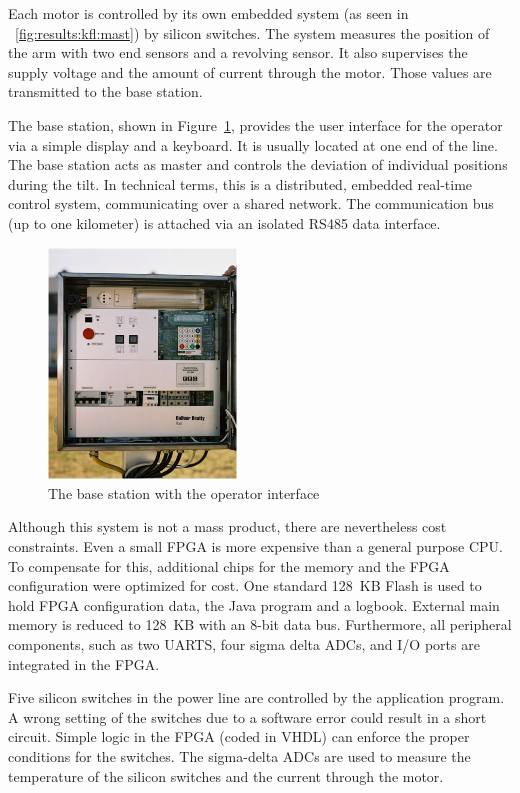 Each motor is controlled by its own embedded system (as seen in
\figurename~\ref{fig:results:kfl:mast}) by silicon switches. The
system measures the position of the arm with two end sensors and a
revolving sensor. It also supervises the supply voltage and the
amount of current through the motor. Those values are transmitted to
the base station.

The base station, shown in Figure~\ref{fig:results:base}, provides
the user interface for the operator via a simple display and a
keyboard. It is usually located at one end of the line. The base
station acts as master and controls the deviation of individual
positions during the tilt. In technical terms, this is a distributed,
embedded real-time control system, communicating over a shared
network. The communication bus (up to one kilometer) is attached via
an isolated RS485 data interface.

\begin{figure}
    \centering
    \includegraphics[width=5cm]{results/base}
    \caption{The base station with the operator interface}
    \label{fig:results:base}
\end{figure}


Although this system is not a mass product, there are nevertheless
cost constraints. Even a small FPGA is more expensive than a general
purpose CPU. To compensate for this, additional chips for the memory
and the FPGA configuration were optimized for cost. One standard
128~KB Flash is used to hold FPGA configuration data, the Java
program and a logbook. External main memory is reduced to 128~KB with
an 8-bit data bus. Furthermore, all peripheral components, such as
two UARTS, four sigma delta ADCs, and I/O ports are integrated in the
FPGA.

Five silicon switches in the power line are controlled by the
application program. A wrong setting of the switches due to a
software error could result in a short circuit. Simple logic in the
FPGA (coded in VHDL) can enforce the proper conditions for the
switches. The sigma-delta ADCs are used to measure the temperature of
the silicon switches and the current through the motor.


